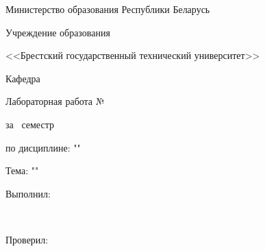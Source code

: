 \begin{center}
    Министерство образования Республики Беларусь

    Учреждение образования

    <<Брестский государственный технический университет>>

    Кафедра \titlePageKafedra
\end{center}

\vfill

\begin{center}
    Лабораторная работа №\titlePageLabNumber

    за \titlePageSemestr~семестр

    по дисциплине: "\titlePageLesson"

    Тема: "\titlePageTopic"
\end{center}

\vfill

\begin{flushright}
    \begin{minipage}[t]{7cm}
        Выполнил:

        \titlePageAuthorType

        \titlePageAuthorSurname~\titlePageAuthorName

        \hspace{0pt}

        Проверил:

        \titlePageLeaderType

        \titlePageLeaderSurname~\titlePageLeaderName
    \end{minipage}
\end{flushright}

\vfill

\begin{center}
    \titlePageCity~\ESKDtheYear
\end{center}